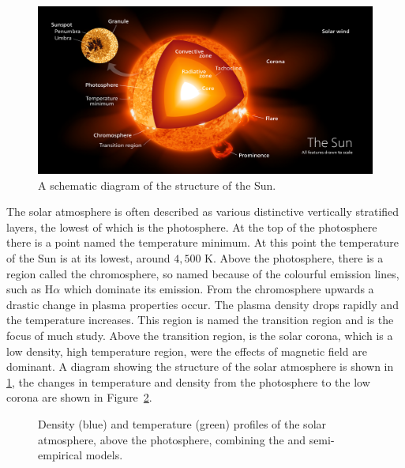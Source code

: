 \documentclass[a4paper,12pt,fourier,authoryear,custommargin]{Classes/PhDThesisPSnPDF}
\begin{document}
\begin{figure}[h]
\centering
\includegraphics[width=0.9\linewidth]{Chapter1/Figs/Sun_poster}
\caption{A schematic diagram of the structure of the Sun. \citep{kelvinsong2015}}
\label{fig:sun_poster}
\end{figure}


The solar atmosphere is often described as various distinctive vertically stratified layers, the lowest of which is the photosphere.
At the top of the photosphere there is a point named the temperature minimum.
At this point the temperature of the Sun is at its lowest, around $4,500$ K.
Above the photosphere, there is a region called the chromosphere, so named because of the colourful emission lines, such as H$\alpha$ which dominate its emission.
From the chromosphere upwards a drastic change in plasma properties occur.
The plasma density drops rapidly and the temperature increases.
This region is named the transition region and is the focus of much study.
Above the transition region, is the solar corona, which is a low density, high temperature region, were the effects of magnetic field are dominant.
A diagram showing the structure of the solar atmosphere is shown in \cref{fig:sun_poster}, the changes in temperature and density from the photosphere to the low corona are shown in Figure~\ref{fig:atmos}.



\begin{figure}[h]
    \centering
    \caption{Density (blue) and temperature (green) profiles of the solar atmosphere, above the photosphere, combining the \cite{mcwhirter1975} and \cite{vernazza1981} semi-empirical models.}
    \label{fig:atmos}
\end{figure}
\end{document}
